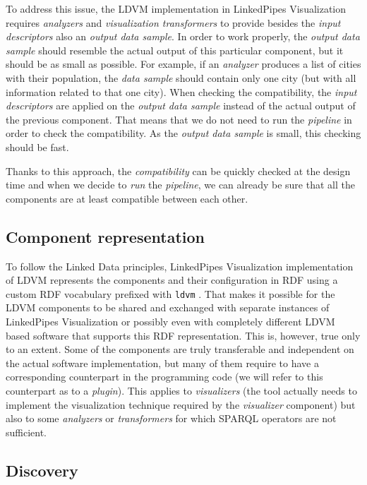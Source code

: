 To address this issue, the LDVM implementation in LinkedPipes Visualization requires \emph{analyzers} and \emph{visualization transformers} to provide besides the \emph{input descriptors} also an \emph{output data sample}. In order to work properly, the \emph{output data sample} should resemble the actual output of this particular component, but it should be as small as possible. For example, if an \emph{analyzer} produces a list of cities with their population, the \emph{data sample} should contain only one city (but with all information related to that one city). When checking the compatibility, the \emph{input descriptors} are applied on the \emph{output data sample} instead of the actual output of the previous component. That means that we do not need to run the \emph{pipeline} in order to check the compatibility. As the \emph{output data sample} is small, this checking should be fast.

Thanks to this approach, the \emph{compatibility} can be quickly checked at the design time and when we decide to \emph{run} the \emph{pipeline}, we can already be sure that all the components are at least compatible between each other.

\subsection{Component representation}
\label{sec:linkedpipes:ldvm-implementation:component-representation}

To follow the Linked Data principles, LinkedPipes Visualization implementation of LDVM represents the  components and their configuration in RDF using a custom RDF vocabulary prefixed with \texttt{ldvm} \cite{ldvm_vocabulary}. That makes it possible for the LDVM components to be shared and exchanged with separate instances of LinkedPipes Visualization or possibly even with completely different LDVM based software that supports this RDF representation. This is, however, true only to an extent. Some of the components are truly transferable and independent on the actual software implementation, but many of them require to have a corresponding counterpart in the programming code (we will refer to this counterpart as to a \emph{plugin}). This applies to \emph{visualizers} (the tool actually needs to implement the visualization technique required by the \emph{visualizer} component) but also to some \emph{analyzers} or \emph{transformers} for which SPARQL operators are not sufficient.

\subsection{Discovery}

